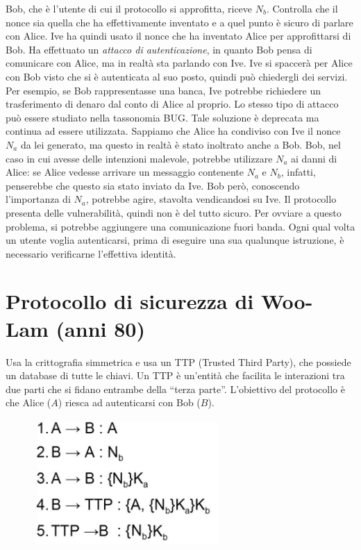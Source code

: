 Bob, che è l'utente di cui il protocollo si approfitta, riceve \(N_b\).
Controlla che il nonce sia quella che
ha effettivamente inventato e a quel punto è sicuro di parlare con Alice.
Ive ha quindi usato il nonce che ha inventato Alice per approfittarsi di
Bob. Ha effettuato un
\textit{attacco di autenticazione}, in quanto Bob pensa di comunicare con
Alice, ma in realtà sta parlando
con Ive.
Ive si spaccerà per Alice con Bob visto che si è autenticata al suo posto,
quindi può chiedergli dei
servizi. Per esempio, se Bob rappresentasse una banca, Ive potrebbe
richiedere un trasferimento
di denaro dal conto di Alice al proprio.
Lo stesso tipo di attacco può essere studiato nella tassonomia BUG. Tale
soluzione è deprecata
ma continua ad essere utilizzata.
Sappiamo che Alice ha condiviso con Ive il nonce \(N_a\) da lei generato, ma
questo in realtà è stato
inoltrato anche a Bob. Bob, nel caso in cui avesse delle intenzioni
malevole, potrebbe utilizzare \(N_a\)
ai danni di Alice: se Alice vedesse arrivare un messaggio contenente \(N_a\)
e \(N_b\), infatti, penserebbe
che questo sia stato inviato da Ive. Bob però, conoscendo l'importanza di
\(N_a\), potrebbe agire,
stavolta vendicandosi su Ive.
Il protocollo presenta delle vulnerabilità, quindi non è del tutto sicuro.
Per ovviare a questo
problema, si potrebbe aggiungere una comunicazione fuori banda. Ogni qual
volta un utente voglia
autenticarsi, prima di eseguire una sua qualunque istruzione, è necessario
verificarne l'effettiva
identità.

\section{Protocollo di sicurezza di Woo-Lam (anni 80)}

Usa la crittografia simmetrica e usa un TTP (Trusted Third Party), che
possiede un database di
tutte le chiavi. Un TTP è un'entità che facilita le interazioni tra due
parti che si fidano entrambe
della ``terza parte''.
L'obiettivo del protocollo è che Alice (\(A\)) riesca ad autenticarsi
con Bob (\(B\)).

\begin{figure}[H]
    \centering
    \includegraphics[width=7cm, keepaspectratio]{capitoli/crittografia/imgs/Mulan.png}
\end{figure}

